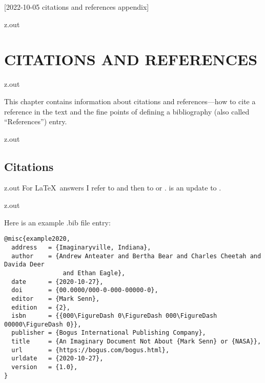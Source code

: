 [2022-10-05 citations and references appendix]

\begin{VerbatimOut}{z.out}
\chapter{CITATIONS AND REFERENCES}
\end{VerbatimOut}

\MyIO


\begin{VerbatimOut}{z.out}

This chapter contains information about citations
and references---how to cite a reference in the text
and the fine points of defining a bibliography
(also called ``References'')
entry.
\end{VerbatimOut}

\MyIO


\begin{VerbatimOut}{z.out}


\section{Citations}
\end{VerbatimOut}

\MyIO


\begin{VerbatimOut}{z.out}
For \LaTeX\ answers I refer to
\cite{lamport1994}
and then to
\cite{goossens1994}
or
\cite{kopka1999}.
\cite{kopka1999}
is an update to
\cite{kopka1995}.
\end{VerbatimOut}

\MyIO


\begin{VerbatimOut}{z.out}

Here is an example .bib file entry:

{\footnotesize
\begin{verbatim}
@misc{example2020,
  address   = {Imaginaryville, Indiana},
  author    = {Andrew Anteater and Bertha Bear and Charles Cheetah and Davida Deer
                and Ethan Eagle},
  date      = {2020-10-27},
  doi       = {00.0000/000-0-000-00000-0},
  editor    = {Mark Senn},
  edition   = {2},
  isbn      = {{000\FigureDash 0\FigureDash 000\FigureDash 00000\FigureDash 0}},
  publisher = {Bogus International Publishing Company},
  title     = {An Imaginary Document Not About {Mark Senn} or {NASA}},
  url       = {https://bogus.com/bogus.html},
  urldate   = {2020-10-27},
  version   = {1.0},
}
\end{verbatim}
}
\end{VerbatimOut}

